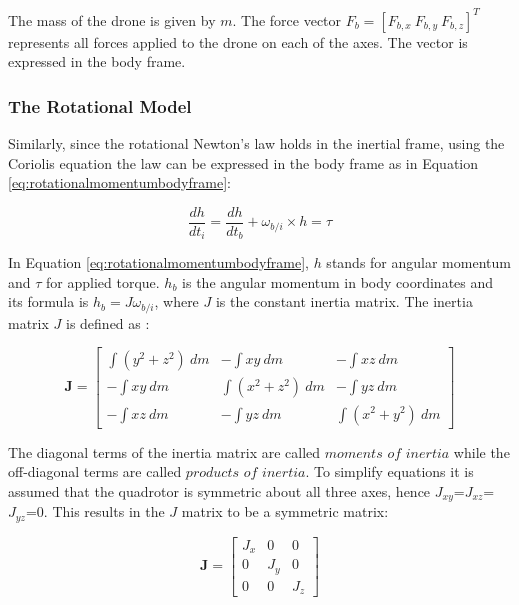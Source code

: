 The mass of the drone is given by $m$. The force vector $F_b = [F_{b,x}\ F_{b,y}\ F_{b,z}]^T$ represents all forces applied to the drone on each of the axes. The vector is expressed in the body frame.\\

\subsubsection{The Rotational Model}

Similarly, since the rotational Newton's law holds in the inertial frame, using the Coriolis equation the law can be expressed in the body frame as in Equation \ref{eq:rotationalmomentumbodyframe}:

\begin{equation}  \label{eq:rotationalmomentumbodyframe}
	\frac{dh}{dt_i} = \frac{dh}{dt_b} + \omega_{b/i} \times h = \tau
\end{equation}

In Equation \ref{eq:rotationalmomentumbodyframe}, $h$ stands for angular momentum and $\tau$ for applied torque. $h_b$ is the angular momentum in body coordinates and its formula is $h_b = J \omega_{b/i}$, where $J$ is the constant inertia matrix. The inertia matrix $J$ is defined as \cite{beard2012small}:

\begin{equation} \label{eq:J}
	\bm{J} =
	\begin{bmatrix}
		\int(y^2 + z^2)~dm & -\int xy~dm        & -\int xz~dm        \\
		-\int xy~dm        & \int(x^2 + z^2)~dm & -\int yz~dm        \\
		-\int xz~dm        & -\int yz~dm        & \int(x^2 + y^2)~dm
	\end{bmatrix}
\end{equation}

The diagonal terms of the inertia matrix are called $moments$ $of$ $inertia$ while the off-diagonal terms are called $products$ $of$ $inertia$. To simplify equations it is assumed that the quadrotor is symmetric about all three axes, hence $J_{xy}$=$J_{xz}$=$J_{yz}$=0.\cite{beard_quadrotor} This results in the $J$ matrix to be a symmetric matrix:

\begin{equation}\label{eq:inertiaMat}
	\bm{J} = 
	\begin{bmatrix}
		J_x     & 0   & 0 \\
		0       & J_y & 0       \\
		0 & 0   & J_z
	\end{bmatrix}
\end{equation}

